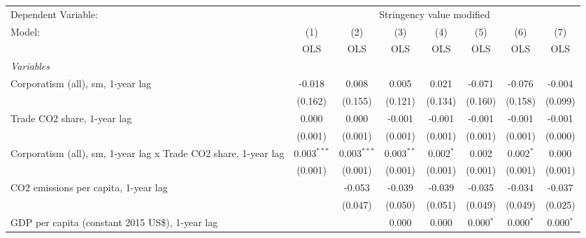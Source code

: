
\begingroup
\centering
\begin{tabular}{lccccccc}
   \toprule
   Dependent Variable: & \multicolumn{7}{c}{Stringency value modified}\\
   Model:                                                          & (1)           & (2)           & (3)          & (4)         & (5)           & (6)           & (7)\\  
                                                                   &  OLS          & OLS           & OLS          & OLS         & OLS           & OLS           & OLS\\  
   \midrule
   \emph{Variables}\\
   Corporatism (all), sm, 1-year lag                               & -0.018        & 0.008         & 0.005        & 0.021       & -0.071        & -0.076        & -0.004\\   
                                                                   & (0.162)       & (0.155)       & (0.121)      & (0.134)     & (0.160)       & (0.158)       & (0.099)\\   
   Trade CO2 share, 1-year lag                                     & 0.000         & 0.000         & -0.001       & -0.001      & -0.001        & -0.001        & -0.001\\   
                                                                   & (0.001)       & (0.001)       & (0.001)      & (0.001)     & (0.001)       & (0.001)       & (0.000)\\   
   Corporatism (all), sm, 1-year lag x Trade CO2 share, 1-year lag & 0.003$^{***}$ & 0.003$^{***}$ & 0.003$^{**}$ & 0.002$^{*}$ & 0.002         & 0.002$^{*}$   & 0.000\\   
                                                                   & (0.001)       & (0.001)       & (0.001)      & (0.001)     & (0.001)       & (0.001)       & (0.001)\\   
   CO2 emissions per capita, 1-year lag                            &               & -0.053        & -0.039       & -0.039      & -0.035        & -0.034        & -0.037\\   
                                                                   &               & (0.047)       & (0.050)      & (0.051)     & (0.049)       & (0.049)       & (0.025)\\   
   GDP per capita (constant 2015 US\$), 1-year lag                 &               &               & 0.000        & 0.000       & 0.000$^{*}$   & 0.000$^{*}$   & 0.000$^{*}$\\   

\end{tabular}
